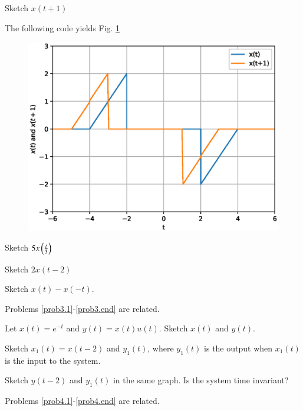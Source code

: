 \documentclass[journal,12pt,twocolumn]{IEEEtran}
\begin{document}
%
\begin{problem}
Sketch  $x(t+1)$
\end{problem}
%
\solution The following code yields Fig. \ref{fig_8a}

\begin{figure}[!h]
\begin{center}
\includegraphics[width=\columnwidth]{./figs/8a}
\end{center}
\label{fig_8a}	
\end{figure}
%
\begin{problem}
Sketch $5x\left(\frac{t}{3}\right)$
\end{problem}
\begin{problem}
Sketch  $2x(t-2)$
\end{problem}
%
%
\begin{problem}
\label{prob2.end}
Sketch  $x(t)-x(-t)$.
\end{problem}
%
Problems \ref{prob3.1}-\ref{prob3.end} are related.
\begin{problem}
\label{prob3.1}
Let $x(t) = e^{-t}$  and $y(t) = x(t)u(t)$. Sketch $x(t)$ and $y(t)$.
\end{problem}
%
\begin{problem}
Sketch $x_1(t) = x(t-2)$ and $y_1(t)$, where $y_1(t)$ is the output when $x_1(t)$ is the input to the system.
\end{problem}
%
\begin{problem}
\label{prob3.end}
Sketch $y(t-2)$ and $y_1(t)$ in the same graph.  Is the system time invariant?
\end{problem}
%
Problems \ref{prob4.1}-\ref{prob4.end} are related.
\end{document}

